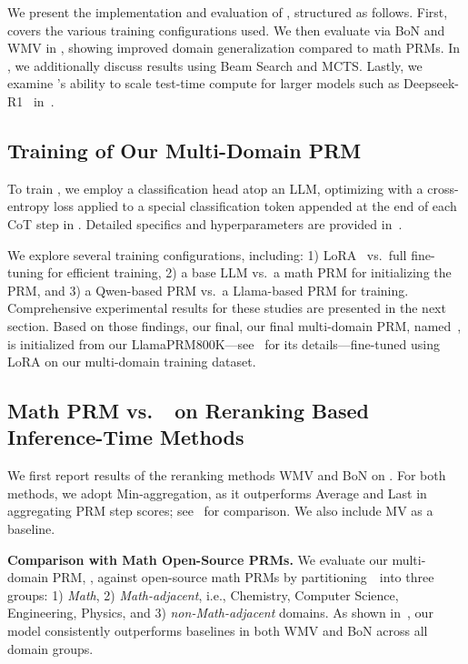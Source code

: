 We present the implementation and evaluation of \ourprm, structured as follows.
First,  covers the various training configurations used.  
We then evaluate \ourprm via BoN and WMV in , showing improved domain generalization compared to math PRMs.  
In , we additionally discuss results using Beam Search and MCTS. Lastly, we examine \ourprm's ability to scale test-time compute for larger models such as Deepseek-R1~\cite{guo2025deepseek} in~.



\subsection{Training of Our Multi-Domain PRM}
\label{sec:mdprm-train}

To train \ourprm, we employ a classification head atop an LLM,
optimizing with a cross-entropy loss applied to a special classification token appended at the end of each CoT step in \ourdatatrain.
Detailed specifics and hyperparameters are provided in~.


We explore several training configurations,
including:
1) LoRA~\citep{hu2022lora} vs.~full fine-tuning for efficient training,
2) a base LLM vs.~a math PRM for initializing the PRM,
and 3) a Qwen-based PRM vs.~a Llama-based PRM for training.
Comprehensive experimental results for these studies are presented in the next section.
Based on those findings, our final,
our final multi-domain PRM, named~\ourprm, is initialized from our LlamaPRM800K---see~ for its details---fine-tuned using LoRA on our multi-domain training dataset.
\subsection{Math PRM vs.~\ourprm~on Reranking Based Inference-Time Methods}
\label{sec:math-v-mdprm}

We first report results of the reranking methods WMV and BoN on \ourdataeval.
For both methods, we adopt Min-aggregation, as it outperforms Average and Last in aggregating PRM step scores;
see~ for comparison.
We also include MV as a baseline.



\textbf{Comparison with Math Open-Source PRMs.}
We evaluate our multi-domain PRM, \ourprm, against open-source math PRMs by partitioning~\ourdataeval~into three groups:
1) \emph{Math},
2) \emph{Math-adjacent}, i.e., Chemistry, Computer Science, Engineering, Physics,
and 3) \emph{non-Math-adjacent} domains.
As shown in~,
our model consistently outperforms baselines in both WMV and BoN across all domain groups.



